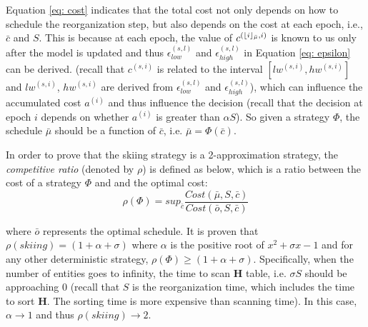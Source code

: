 Equation \ref{eq: cost} indicates that the total cost not only depends on how to schedule the reorganization step, but also depends on the cost at each epoch, i.e., $\bar{c}$ and $S$. This is because at each epoch, the value of $c^{(\lfloor i\rfloor_{\bar{\mu}}, i)}$ is known to us only after the model is updated and thus $\epsilon^{(s,l)}_{low}$ and $\epsilon^{(s,l)}_{high}$ in Equation \ref{eq: epsilon} can be derived. (recall that $c^{(s,i)}$ is related to the interval $[lw^{(s,i)}, hw^{(s,i)}]$ and $lw^{(s,i)}$, $hw^{(s,i)}$ are derived from $\epsilon^{(s,l)}_{low}$ and $\epsilon^{(s,l)}_{high}$), which can influence the accumulated cost $a^{(i)}$ and thus influence the decision (recall that the decision at epoch $i$ depends on whether $a^{(i)}$ is greater than $\alpha S$). So given a strategy $\Phi$, the schedule $\bar{\mu}$ should be a function of $\bar{c}$, i.e. $\bar{\mu} = \Phi(\bar{c})$.

In order to prove that the skiing strategy is a 2-approximation strategy, the {\em competitive ratio} (denoted by $\rho$) is defined as below, which is a ratio between the cost of a strategy $\Phi$ and and the optimal cost:
\begin{equation}
    \rho(\Phi) = sup_{\bar{c}}\frac{Cost(\bar{\mu}, S, \bar{c})}{Cost(\bar{o}, S, \bar{c})}
\end{equation}


where $\bar{o}$ represents the optimal schedule. It is proven that $\rho(skiing) = (1+\alpha + \sigma)$ where $\alpha$ is the positive root of $x^2 + \sigma x - 1$ and for any other deterministic strategy, $\rho(\Phi) \geq (1+\alpha + \sigma)$. Specifically, when the number of entities goes to infinity, the time to scan $\textbf{H}$ table, i.e. $\sigma S$ should be approaching 0 (recall that $S$ is the reorganization time, which includes the time to sort $\textbf{H}$. The sorting time is more expensive than scanning time). In this case, $\alpha \rightarrow 1$ and thus $\rho(skiing) \rightarrow 2$.

% 



